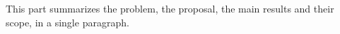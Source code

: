 
This part summarizes the problem, the proposal, the main results and their scope, in a single paragraph.
